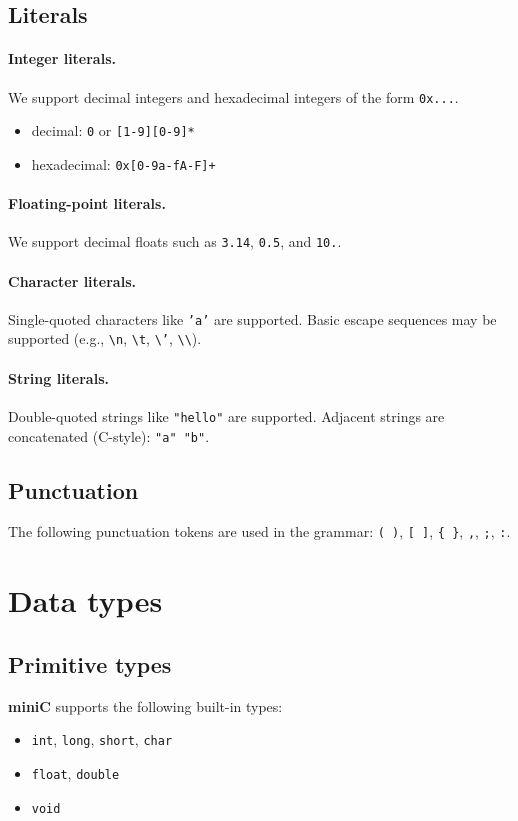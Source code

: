 \documentclass[11pt]{article}
\newcommand{\lang}{\textbf{miniC}}
\begin{document}
\subsection{Literals}
\paragraph{Integer literals.}
We support decimal integers and hexadecimal integers of the form \texttt{0x...}.
\begin{itemize}
	\item decimal: \texttt{0} or \texttt{[1-9][0-9]*}
	\item hexadecimal: \texttt{0x[0-9a-fA-F]+}
\end{itemize}

\paragraph{Floating-point literals.}
We support decimal floats such as \texttt{3.14}, \texttt{0.5}, and \texttt{10.}.

\paragraph{Character literals.}
Single-quoted characters like \texttt{'a'} are supported.
Basic escape sequences may be supported (e.g., \texttt{\textbackslash n}, \texttt{\textbackslash t}, \texttt{\textbackslash '}, \texttt{\textbackslash \textbackslash}).

\paragraph{String literals.}
Double-quoted strings like \texttt{"hello"} are supported.
Adjacent strings are concatenated (C-style): \texttt{"a" "b"}.

\subsection{Punctuation}
The following punctuation tokens are used in the grammar: \texttt{( )}, \texttt{[ ]}, \texttt{\{ \}}, \texttt{,}, \texttt{;}, \texttt{:}.

\section{Data types}
\subsection{Primitive types}
\lang{} supports the following built-in types:
\begin{itemize}
	\item \texttt{int}, \texttt{long}, \texttt{short}, \texttt{char}
	\item \texttt{float}, \texttt{double}
	\item \texttt{void}
\end{itemize}
\end{document}
